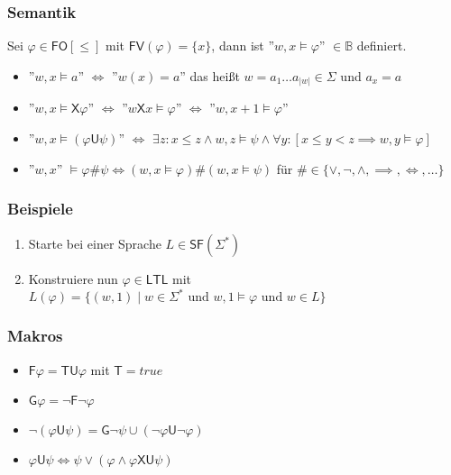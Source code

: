 \documentclass[12pt, german]{article}
\newcommand{\B}{\mathbb{B}}
\newcommand{\sigstern}{\Sigma^\ast}
\newcommand{\starfree}{\mathsf{SF}}
\newcommand{\fv}{\mathsf{FV}}
\newcommand{\fo}{\mathsf{FO}}
\newcommand{\ltl}{\mathsf{LTL}}
\newcommand{\sX}{\mathsf{X}}
\newcommand{\sF}{\mathsf{F}}
\newcommand{\sG}{\mathsf{G}}
\newcommand{\sT}{\mathsf{T}}
\newcommand{\sU}{\mathsf{U}}
\begin{document}
\subsubsection{Semantik}
	Sei $\varphi \in \fo[\leq]$ mit $\fv(\varphi) = \{x\}$, dann ist ''$w,x \models \varphi$'' $\in \B$ definiert.
	\begin{itemize}
		\item ''$w,x \models a$'' $\iff$ ''$w(x) = a$'' das heißt $w = a_1 \ldots a_{|w|} \in \Sigma$ und $a_x = a$
		\item ''$w,x \models \sX \varphi$'' $\iff$ ''$w\sX x \models \varphi$'' $\iff$ ''$w, x+1 \models \varphi$''
		\item ''$w, x \models (\varphi \sU \psi)$'' $\iff$ $\exists z : x \leq z \land w, z \models \psi \land \forall y: [x \leq y < z \implies w, y \models \varphi]$
		\item ''$w,x$'' $\models \varphi \#\psi \iff (w,x \models \varphi) \# (w,x \models \psi )$ für $\# \in \{\lor, \neg, \land, \implies, \iff, \ldots\}$
	\end{itemize}

\subsubsection{Beispiele}
		\begin{enumerate}[label=\arabic*.)]
			\item Starte bei einer Sprache $L \in \starfree(\sigstern)$
			\item Konstruiere nun $\varphi \in \ltl$ mit $L(\varphi) = \{(w,1) \mid w \in \sigstern \text{ und } w,1 \models \varphi \text{ und } w \in L\}$
		\end{enumerate}
\subsubsection{Makros}
\begin{multicols}{2}
		\begin{itemize}
		\item $\sF \varphi = \sT \sU \varphi$ mit $\sT = true$
		\item $\sG \varphi = \neg \sF \neg \varphi$
		\item $\neg(\varphi \sU \psi) = \sG \neg \psi \cup (\neg \varphi \sU \neg \varphi)$
		\item $\varphi \sU \psi \iff \psi \lor (\varphi \land \varphi\sX\sU\psi)$
	\end{itemize}
\end{multicols}
	
\end{document}
